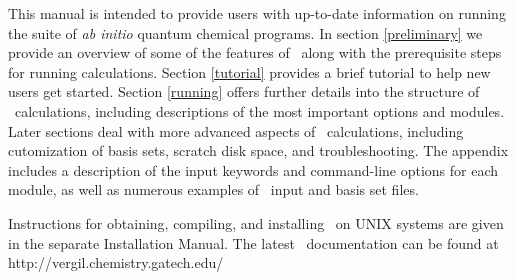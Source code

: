 This manual is intended to provide users with up-to-date information
on running the \PSIthree suite of {\em ab initio} quantum chemical
programs.  In section \ref{preliminary} we provide an overview of some
of the features of \PSIthree\ along with the prerequisite steps for
running calculations.  Section \ref{tutorial} provides a brief
tutorial to help new users get started.  Section \ref{running} offers
further details into the structure of \PSIthree\ calculations,
including descriptions of the most important options and modules.
Later sections deal with more advanced aspects of \PSIthree\
calculations, including cutomization of basis sets, scratch disk
space, and troubleshooting.  The appendix includes a description of
the input keywords and command-line options for each module, as well
as numerous examples of \PSIthree\ input and basis set files.

Instructions for obtaining, compiling, and installing \PSIthree\ on
UNIX systems are given in the separate Installation Manual.  The
latest \PSIthree\ documentation can be found at
{http://vergil.chemistry.gatech.edu/}


